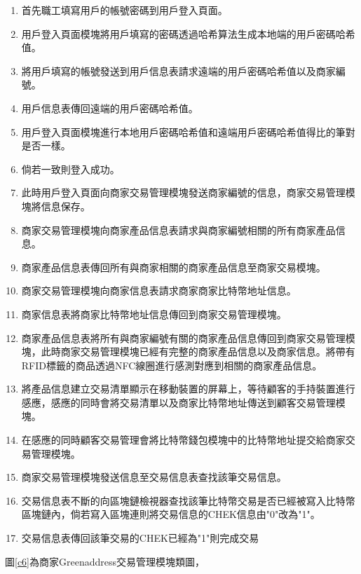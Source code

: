 	\begin{enumerate}
	\item 首先職工填寫用戶的帳號密碼到用戶登入頁面。
	\item 用戶登入頁面模塊將用戶填寫的密碼透過哈希算法生成本地端的用戶密碼哈希值。
	\item 將用戶填寫的帳號發送到用戶信息表請求遠端的用戶密碼哈希值以及商家編號。
	\item 用戶信息表傳回遠端的用戶密碼哈希值。
	\item 用戶登入頁面模塊進行本地用戶密碼哈希值和遠端用戶密碼哈希值得比的筆對是否一樣。
	\item 倘若一致則登入成功。
	\item 此時用戶登入頁面向商家交易管理模塊發送商家編號的信息，商家交易管理模塊將信息保存。
	\item 商家交易管理模塊向商家產品信息表請求與商家編號相關的所有商家產品信息。
	\item 商家產品信息表傳回所有與商家相關的商家產品信息至商家交易模塊。
	\item 商家交易管理模塊向商家信息表請求商家商家比特幣地址信息。
	\item 商家信息表將商家比特幣地址信息傳回到商家交易管理模塊。
	\item 商家產品信息表將所有與商家編號有關的商家產品信息傳回到商家交易管理模塊，此時商家交易管理模塊已經有完整的商家產品信息以及商家信息。將帶有RFID標籤的商品透過NFC線圈進行感測對應到相關的商家產品信息。
	\item 將產品信息建立交易清單顯示在移動裝置的屏幕上，等待顧客的手持裝置進行感應，感應的同時會將交易清單以及商家比特幣地址傳送到顧客交易管理模塊。

	\item 在感應的同時顧客交易管理會將比特幣錢包模塊中的比特幣地址提交給商家交易管理模塊。
	\item 商家交易管理模塊發送信息至交易信息表查找該筆交易信息。
	\item 交易信息表不斷的向區塊鏈檢視器查找該筆比特幣交易是否已經被寫入比特幣區塊鏈內，倘若寫入區塊連則將交易信息的CHEK信息由"0"改為"1"。
	\item 交易信息表傳回該筆交易的CHEK已經為"1"則完成交易
	
	\end{enumerate}

	圖\ref{c6}為商家Greenaddress交易管理模塊類圖，

	

